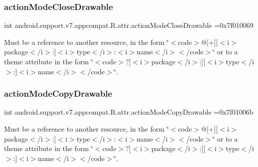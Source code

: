 \subsubsection{\texorpdfstring{action\+Mode\+Close\+Drawable}{actionModeCloseDrawable}}
{\footnotesize\ttfamily int android.\+support.\+v7.\+appcompat.\+R.\+attr.\+action\+Mode\+Close\+Drawable =0x7f010069\hspace{0.3cm}{\ttfamily [static]}}

Must be a reference to another resource, in the form \char`\"{}$<$code$>$@\mbox{[}+\mbox{]}\mbox{[}$<$i$>$package$<$/i$>$\+:\mbox{]}$<$i$>$type$<$/i$>$\+:$<$i$>$name$<$/i$>$$<$/code$>$\char`\"{} or to a theme attribute in the form \char`\"{}$<$code$>$?\mbox{[}$<$i$>$package$<$/i$>$\+:\mbox{]}\mbox{[}$<$i$>$type$<$/i$>$\+:\mbox{]}$<$i$>$name$<$/i$>$$<$/code$>$\char`\"{}. \mbox{\label{classandroid_1_1support_1_1v7_1_1appcompat_1_1R_1_1attr_ae03dbdfc7235f1d244357a9d8a548519}} 
\subsubsection{\texorpdfstring{action\+Mode\+Copy\+Drawable}{actionModeCopyDrawable}}
{\footnotesize\ttfamily int android.\+support.\+v7.\+appcompat.\+R.\+attr.\+action\+Mode\+Copy\+Drawable =0x7f01006b\hspace{0.3cm}{\ttfamily [static]}}

Must be a reference to another resource, in the form \char`\"{}$<$code$>$@\mbox{[}+\mbox{]}\mbox{[}$<$i$>$package$<$/i$>$\+:\mbox{]}$<$i$>$type$<$/i$>$\+:$<$i$>$name$<$/i$>$$<$/code$>$\char`\"{} or to a theme attribute in the form \char`\"{}$<$code$>$?\mbox{[}$<$i$>$package$<$/i$>$\+:\mbox{]}\mbox{[}$<$i$>$type$<$/i$>$\+:\mbox{]}$<$i$>$name$<$/i$>$$<$/code$>$\char`\"{}. \mbox{\label{classandroid_1_1support_1_1v7_1_1appcompat_1_1R_1_1attr_a06308791b23bb0dfb5c10b607c6fb008}} 
